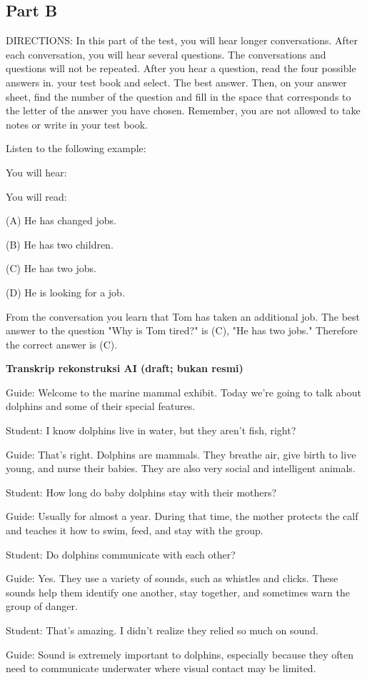 \documentclass[12pt]{article}
\begin{document}
\subsection*{Part B}
DIRECTIONS: In this part of the test, you will hear longer conversations. After each conversation, you will hear several questions. The conversations and questions will not be repeated. After you hear a question, read the four possible answers in. your test book and select. The best answer. Then, on your answer sheet, find the number of the question and fill in the space that corresponds to the letter of the answer you have chosen. Remember, you are not allowed to take notes or write in your test book.\par
\begin{exampleblock}
Listen to the following example:\par
You will hear:\par
You will read:\par
(A) He has changed jobs.\par
(B) He has two children.\par
(C) He has two jobs.\par
(D) He is looking for a job.\par
From the conversation you learn that Tom has taken an additional job. The best answer to the question "Why is Tom tired?" is (C), "He has two jobs." Therefore the correct answer is (C).\par
\end{exampleblock}
\begin{exampleblock}
\textbf{Transkrip rekonstruksi AI (draft; bukan resmi)}\par
Guide: Welcome to the marine mammal exhibit. Today we're going to talk about dolphins and some of their special features.\par
Student: I know dolphins live in water, but they aren't fish, right?\par
Guide: That's right. Dolphins are mammals. They breathe air, give birth to live young, and nurse their babies. They are also very social and intelligent animals.\par
Student: How long do baby dolphins stay with their mothers?\par
Guide: Usually for almost a year. During that time, the mother protects the calf and teaches it how to swim, feed, and stay with the group.\par
Student: Do dolphins communicate with each other?\par
Guide: Yes. They use a variety of sounds, such as whistles and clicks. These sounds help them identify one another, stay together, and sometimes warn the group of danger.\par
Student: That's amazing. I didn't realize they relied so much on sound.\par
Guide: Sound is extremely important to dolphins, especially because they often need to communicate underwater where visual contact may be limited.\par
\end{exampleblock}
\end{document}
